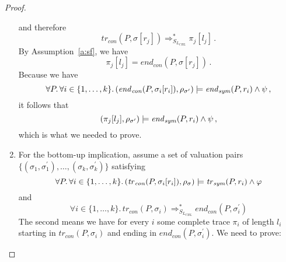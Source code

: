 \begin{proof}
\begin{enumerate}
\begin{equation*}
            \end{equation*}
            and therefore
            \begin{equation*}
                \mathit{tr}_{\mathit{con}}(P, \sigma[r_j])
                \Rightarrow^*_{S_{L_{\mathit{CHL}}}}
                \pi_j[l_j] \, .
            \end{equation*}
            By Assumption~\ref{a:sf}, we have
            \begin{equation*}
                \pi_j[l_j] = \mathit{end}_{\mathit{con}}(P, \sigma[r_j]) \, .
            \end{equation*}
            Because we have
            \begin{equation*}
                \forall P.\, \forall i \in \{ 1, \ldots, k \} . \,
                (\mathit{end}_{\mathit{con}}(P, \sigma_i[r_i]), \rho_{\sigma^\prime})
                \models \mathit{end}_{\mathit{sym}}(P, r_i) \land \psi \, ,
            \end{equation*}
            it follows that
            \begin{equation*}
                (\pi_j[l_j], \rho_{\sigma^\prime}) \models \mathit{end}_{\mathit{sym}}(P, r_i) \land \psi \, ,
            \end{equation*}
            which is what we needed to prove.
        \item For the bottom-up implication,
            assume a set of valuation pairs $\{ (\sigma_1,\sigma_1^\prime),\ldots,(\sigma_k,\sigma_k^\prime) \}$
            satisfying
            \begin{equation*}
                \forall P.\, \forall i \in \{ 1, \ldots, k \} . \,
                    (\mathit{tr}_{\mathit{con}}(P, \sigma_i[r_i]), \rho_\sigma)
                    \models \mathit{tr}_{\mathit{sym}}(P, r_i) \land \varphi
            \end{equation*}
            and
            \begin{equation*}
                \forall i \in \{ 1, \ldots, k \}.\,
                \mathit{tr}_{\mathit{con}}(P, \sigma_i) \Rightarrow^*_{S_{L_{\mathit{CHL}}}} \mathit{end}_{\mathit{con}}(P, \sigma^\prime_i)
            \end{equation*}
            The second means we have for every $i$ some complete trace $\pi_i$ of length $l_i$
            starting in $\mathit{tr}_{\mathit{con}}(P, \sigma_i)$ and ending in $\mathit{end}_{\mathit{con}}(P, \sigma^\prime_i)$.
            We need to prove:

\end{enumerate}
\end{proof}
